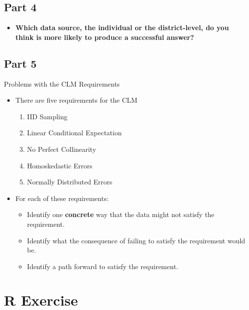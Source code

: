 \documentclass[
]{book}
\providecommand{\tightlist}{%
  \setlength{\itemsep}{0pt}\setlength{\parskip}{0pt}}
\theoremstyle{definition}
\theoremstyle{definition}
\theoremstyle{definition}
\theoremstyle{definition}
\theoremstyle{remark}
\begin{document}
\hypertarget{part-4}{%
\subsection{Part 4}\label{part-4}}

\begin{itemize}
\tightlist
\item
  \textbf{Which data source, the individual or the district-level, do you think is more likely to produce a successful answer?}
\end{itemize}

\hypertarget{part-5}{%
\subsection{Part 5}\label{part-5}}

Problems with the CLM Requirements

\begin{itemize}
\item
  There are five requirements for the CLM

  \begin{enumerate}
  \def\labelenumi{\arabic{enumi}.}
  \tightlist
  \item
    IID Sampling
  \item
    Linear Conditional Expectation
  \item
    No Perfect Collinearity
  \item
    Homoskedastic Errors
  \item
    Normally Distributed Errors
  \end{enumerate}
\item
  For each of these requirements:

  \begin{itemize}
  \tightlist
  \item
    Identify one \textbf{concrete} way that the data might not satisfy the requirement.
  \item
    Identify what the consequence of failing to satisfy the requirement would be.
  \item
    Identify a path forward to satisfy the requirement.
  \end{itemize}
\end{itemize}

\hypertarget{r-exercise-3}{%
\section{R Exercise}\label{r-exercise-3}}
\end{document}

